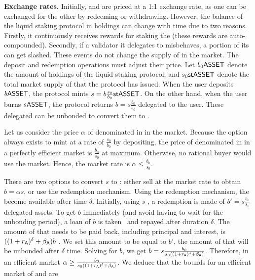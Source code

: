 \noindent
\textbf{Exchange rates.} Initially, \asset and \stasset are priced at a 1:1 exchange rate,
as one can be exchanged for the other by redeeming or withdrawing. However, the balance
of the liquid staking protocol in \asset holdings can change with time due to two reasons.
Firstly, it continuously receives rewards for staking the \asset (these rewards are
auto-compounded). Secondly, if a validator it delegates to misbehaves, a portion of its
\asset can get slashed. These events do not change the supply of \stasset in the market.
The deposit and redemption operations must adjust their price.
Let $b_0 \text{\textsf{ASSET}}$ denote the amount of \asset holdings of the liquid staking
protocol, and $s_0 \text{\textsf{stASSET}}$ denote the total market supply of \stasset that the protocol
has issued. When the user deposits $b \text{\textsf{ASSET}}$, the protocol mints $s = b \frac{s_0}{b_0} \text{\textsf{stASSET}}$.
On the other hand, when the user burns $s \text{\textsf{ASSET}}$, the protocol returns $b = s \frac{b_0}{s_0}$
delegated \asset to the user. These delegated \asset can be unbonded to convert them
to \asset.

Let us consider the price $\alpha$ of \stasset denominated in \asset in the market.
Because the option always exists to mint at a rate of $\frac{s_0}{b_0}$ by
depositing, the price of \stasset denominated in \asset in a perfectly
efficient market is $\frac{b_0}{s_0}$ at maximum. Otherwise, no
rational buyer would use the market. Hence, the market rate is
$\alpha \leq \frac{b_0}{s_0}$.

There are two options to convert $s$ \stasset to \asset: either sell
at the market rate to obtain $b = \alpha s$, or use the redemption mechanism.
Using the redemption mechanism, the \assets become available after time $\delta$.
Initially, using $s$ \stasset, a redemption is made of $b' = s \frac{b_0}{s_0}$
delegated assets. To get $b$ \asset immediately (and avoid having to wait
for the unbonding period), a loan of $b$ \asset is taken~\cite{liquid-staking-report} and
repayed after duration $\delta$. The amount of \asset that needs to be paid back,
including principal and interest, is $((1 + r_{\textsf{A}})^\delta + \beta_{\textsf{A}})b$ \asset.
We set this amount to be equal to $b'$, the amount of \assets that will be
unbonded after $\delta$ time. Solving for $b$, we get
$b = s \frac{b_0}{s_0 ((1 + r_{\textsf{A}})^\delta + \beta_{\textsf{A}})}$.
Therefore, in an efficient market $\alpha \geq \frac{b_0}{s_0 ((1 + r_{\textsf{A}})^\delta + \beta_{\textsf{A}})}$.
We deduce that the bounds for an efficient market of \asset and \stasset are


